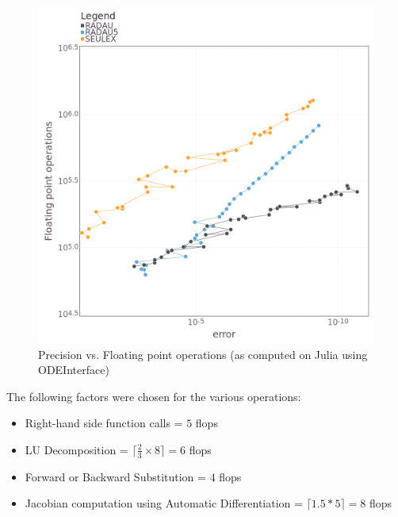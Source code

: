 \documentclass[notitlepage,12pt]{article}
\begin{document}
\begin{figure}[H]
\centering
\includegraphics[scale=0.4]{../ImagesAndPDFs/Plots/vdpolPrecisionTestFlops.png}
\caption{Precision vs. Floating point operations (as computed on Julia using ODEInterface)}
\label{fig:vdpolJuliaFlops}
\end{figure}

The following factors were chosen for the various operations:
\begin{itemize}
\item Right-hand side function calls = $5$ flops
\item LU Decomposition = $\lceil \frac{2}{3}\times 8\rceil = 6$ flops
\item Forward or Backward Substitution = $4$ flops
\item Jacobian computation using Automatic Differentiation = $\lceil 1.5*5 \rceil = 8$ flops
\end{itemize}
\end{document}
